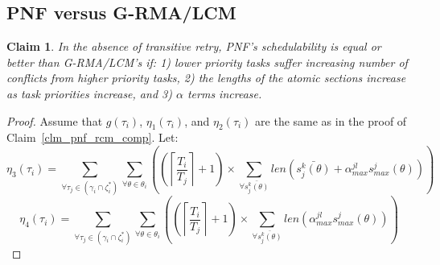 \documentclass[12pt,english]{report}
\newtheorem{clm}{Claim}
\newtheorem{proof}{Proof}
\begin{document}
\subsection{PNF versus G-RMA/LCM}

\begin{clm}\label{sub:pnf_lcm_rma_comp}
%
In the absence of transitive retry, PNF's schedulability is equal or better than G-RMA/LCM's if: 1) lower priority tasks suffer increasing number of conflicts from higher priority tasks, 2) the lengths of the atomic sections increase as task priorities increase, and 3) $\alpha$ terms increase.
%
\end{clm}
\begin{proof}\normalfont
Assume that $g(\tau_{i})$, $\eta_{1}(\tau_{i})$, and $\eta_{2}(\tau_{i})$ are the same as in the proof of Claim~\ref{clm_pnf_rcm_comp}. Let:
\begin{equation*}
\eta_{3}(\tau_{i}) = \sum_{\forall\tau_{j}\in(\gamma_{i}\cap\zeta_{i}^{*})}\sum_{\forall\theta\in\theta_{i}}\left(\left(\left\lceil \frac{T_{i}}{T_{j}}\right\rceil +1\right)\times \sum_{\forall\bar{s_{j}^{k}(\theta)}}len\left(\bar{s_{j}^{k}(\theta)}+\alpha_{max}^{jl}s_{max}^{j}(\theta)\right)\right)
\end{equation*}
\begin{equation*}
\eta_{4}(\tau_{i}) = \sum_{\forall\tau_{j}\in(\gamma_{i}\cap\zeta_{i}^{*})}\sum_{\forall\theta\in\theta_{i}}\left(\left(\left\lceil \frac{T_{i}}{T_{j}}\right\rceil +1\right) \times \sum_{\forall\bar{s_{j}^{k}(\theta)}}len\left(\alpha_{max}^{jl}s_{max}^{j}(\theta)\right)\right)
\end{equation*}


\end{proof}
\end{document}
